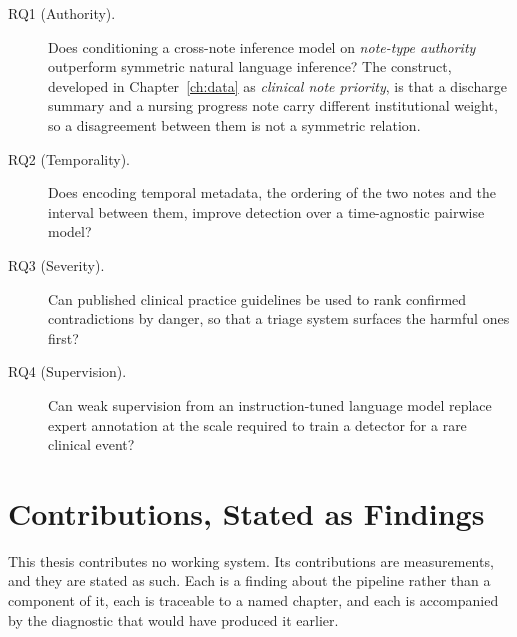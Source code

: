 \begin{description}
\item[RQ1 (Authority).] Does conditioning a cross-note inference model on
      \emph{note-type authority} outperform symmetric natural language
      inference? The construct, developed in Chapter~\ref{ch:data} as
      \emph{clinical note priority}, is that a discharge summary and a nursing
      progress note carry different institutional weight, so a disagreement
      between them is not a symmetric relation.
\item[RQ2 (Temporality).] Does encoding temporal metadata, the ordering of the
      two notes and the interval between them, improve detection over a
      time-agnostic pairwise model?
\item[RQ3 (Severity).] Can published clinical practice guidelines be used to
      rank confirmed contradictions by danger, so that a triage system surfaces
      the harmful ones first?
\item[RQ4 (Supervision).] Can weak supervision from an instruction-tuned
      language model replace expert annotation at the scale required to train a
      detector for a rare clinical event?
\end{description}

\section{Contributions, Stated as Findings}
\label{sec:intro-contributions}

This thesis contributes no working system. Its contributions are measurements,
and they are stated as such. Each is a finding about the pipeline rather than a
component of it, each is traceable to a named chapter, and each is accompanied
by the diagnostic that would have produced it earlier.

